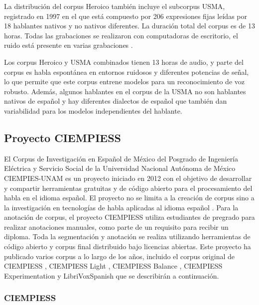 \documentclass[a4paper,12pt,twoside]{report}
\begin{document}
La distribución del corpus Heroico también incluye el subcorpus USMA, registrado en 1997 en el que está compuesto por 206 expresiones fijas leídas por 18 hablantes nativos y no nativos diferentes. La duración total del corpus es de 13 horas. Todas las grabaciones se realizaron con computadoras de escritorio, el ruido está presente en varias grabaciones \cite{heroico}.

Los corpus Heroico y USMA combinados tienen 13 horas de audio, y parte del corpus es habla espontánea en entornos ruidosos y diferentes potencias de señal, lo que permite que este corpus entrene modelos para un reconocimiento de voz robusto. Además, algunos hablantes en el corpus de la USMA no son hablantes nativos de español y hay diferentes dialectos de español que también dan variabilidad para los modelos independientes del hablante.

\subsection{Proyecto CIEMPIESS}

El Corpus de Investigación en Español de México del Posgrado de Ingeniería Eléctrica y Servicio Social de la Universidad Nacional Autónoma de México CIEMPIES-UNAM es un proyecto iniciado en 2012 con el objetivo de desarrollar y compartir herramientas gratuitas y de código abierto para el procesamiento del habla en el idioma español. El proyecto no se limita a la creación de corpus sino a la investigación en tecnologías de habla aplicadas al idioma español \cite{CIEMPIESS-Webpage}. Para la anotación de corpus, el proyecto CIEMPIESS utiliza estudiantes de pregrado para realizar anotaciones manuales, como parte de un requisito para recibir un diploma. Toda la segmentación y anotación se realiza utilizando herramientas de código abierto y corpus final distribuido bajo licencias abiertas. Este proyecto ha publicado varios corpus a lo largo de los años, incluido el corpus original de CIEMPIESS \cite {CIEMPIESS}, CIEMPIESS Light \cite {CIEMPIESS-LIGHT}, CIEMPIESS Balance \cite {CIEMPIESS-BALANCE}, CIEMPIESS Experimentation \cite {CIEMPIESS-Experimentation} y LibriVoxSpanish \cite {LibriVox-Spanish} que se describirán a continuación.

\subsubsection{CIEMPIESS}
\end{document}
